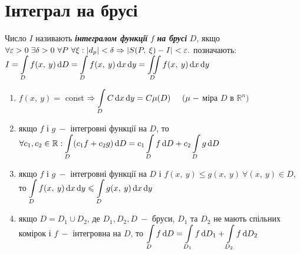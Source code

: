 

\newpage
\section{\Large{Інтеграл на брусі}}

\begin{definition}
    Число $I$ називають\textcolor{NavyBlue}{\textbf{\textit{ інтегралом функції}}} $f$\textcolor{NavyBlue}{\textbf{\textit{ на брусі}}} $D$, якщо \newline $\forall \varepsilon > 0 \;  \exists \delta >0 \ \forall P \ \forall \xi: |d_p| < \delta \Rightarrow  |S(P, \: \xi) - I| < \varepsilon. \newline$
    позначають: $I = \displaystyle\int\limits_D f(x, \: y) \, \mathrm{d}D = \displaystyle\int\limits_D f(x, \: y) \, \mathrm{d}x \,  \mathrm{d}y = \iint\limits_{D} f(x, \: y) \, \mathrm{d}x \, \mathrm{d}y$ 
\end{definition}


\begin{theorem}
\end{theorem}
    \begin{enumerate}
        \item $f(x, \: y) = $ const $\Rightarrow \displaystyle\int\limits_D C \, \mathrm{d}x \, \mathrm{d}y = C\mu(D) \;\;\;\;\; (\mu \;- $ міра $D$ в $\mathbb{R}^n)$
        
        \item якщо $f$ і $g \: - $ інтегровні функції на $D$, то $\forall c_1, c_2 \in \mathbb{R}:
        \newline {\Int_D(c_1f + c_2g) \, \mathrm{d}D = c_1\Int_D f \, \mathrm{d}D + c_2 \Int_D g \, \mathrm{d}D}$
        
        \item якщо $f$ і $g \: - $ інтегровні функції на $D$ і $f(x, \: y) \leqslant g(x, \: y) \ \forall (x, \: y) \in D$, то \newline $\displaystyle\int\limits_D f(x, \: y) \, \mathrm{d}x \, \mathrm{d}y \leqslant \displaystyle\int\limits_D g(x, \: y) \, \mathrm{d}x \, \mathrm{d}y$ 
        
        \item якщо $D = D_1 \cup D_2$, де $D_1, D_2, D \: -$ бруси, $D_1$ та $D_2$ не мають спільних комірок \newline і $f \: - $ інтегровна на $D$, то $\displaystyle\int\limits_D f \, \mathrm{d}D = \displaystyle\int\limits_{D_1} f \, \mathrm{d}D_1 + \displaystyle\int\limits_{D_2} f \, \mathrm{d}D_2$
    \end{enumerate}

